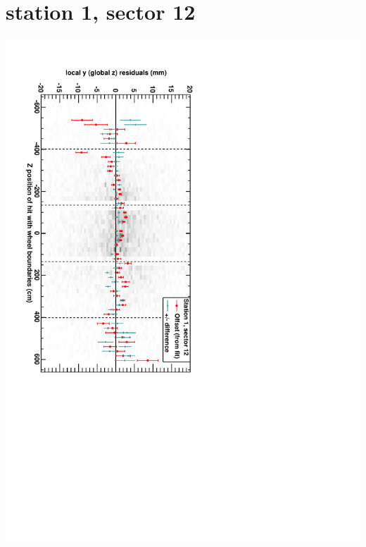 \documentclass[compress]{beamer}
\begin{document}
\section*{station 1, sector 12}
\begin{frame} \vfill \mbox{\hspace{-1 cm}\includegraphics[height=1.2\linewidth, angle=90]{DTzVsZ_st1_sr12.pdf}} \end{frame}
\end{document}
